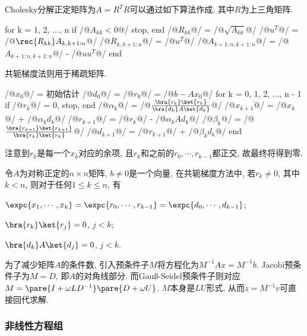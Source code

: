 \documentclass[20pt]{extarticle}
\begin{document}
Cholesky分解正定矩阵为$A=R^TR$可以通过如下算法作成. 其中$R$为上三角矩阵.
\begin{matlablst}
for k = 1, 2, ..., n
    if /@$A_{kk}<0$@/ stop, end
    /@$R_{kk}$@/ = /@$\sqrt{A_{kk}}$@/
    /@$u^T$@/ = /@$\rec{R_{kk}}A_{k,k+1:n}$@/
    /@$R_{k,k+1:n}$@/ = /@$u^T$@/
    /@$A_{k+1:n,k+1:n}$@/ = /@$A_{k+1:n,k+1:n}$@/ - /@$uu^T$@/
end
\end{matlablst}
共轭梯度法则用于稀疏矩阵.
\begin{matlablst}
/@$x_0$@/ = 初始估计
/@$d_0$@/ = /@$r_0$@/ = /@$b-Ax_0$@/
for k = 0, 1, 2, ..., n - 1
    if /@$r_k$@/ = 0, stop, end
    /@$\alpha_k$@/ = /@$\frac{\bra{r_k}\ket{r_k}}{\bra{d_k}A\ket{d_k}}$@/
    /@$x_{k+1}$@/ = /@$x_k$@/ + /@$\alpha_kd_k$@/
    /@$r_{k+1}$@/ = /@$r_k$@/ - /@$\alpha_kAd_k$@/
    /@$\beta_k$@/ = /@$\frac{\bra{r_{k+1}}\ket{r_{k+1}}}{\bra{r_k}\ket{r_k}}$@/
    /@$d_{k+1}$@/ = /@$r_{k+1}$@/ + /@$\beta_k d_k$@/
end
\end{matlablst}
注意到$r_k$是每一个$x_k$对应的余项, 且$r_k$和之前的$r_0,\cdots,r_{k-1}$都正交, 故最终将得到零.

\begin{theorem}
    令$A$为对称正定的$n\times n$矩阵, $b\neq 0$是一个向量, 在共轭梯度方法中, 若$r_k\neq 0$, 其中$k<n$, 则对于任何$1\le k\le n$, 有
    \begin{cenum}
        \item $\expc{x_1,\cdots,x_k} = \expc{r_0,\cdots,r_{k-1}} = \expc{d_0,\cdots,d_{k-1}}$;
        \item $\bra{r_k}\ket{r_j} = 0$, $j < k$;
        \item $\bra{d_k}A\ket{d_j} = 0$, $j < k$.
    \end{cenum}
\end{theorem}

\par
为了减少矩阵$A$的条件数, 引入预条件子$M$将方程化为$M^{-1}Ax = M^{-1}b$. Jacobi预条件子为$M=D$, 即$A$的对角线部分. 而Gau\ss-Seidel预条件子则对应$M = \pare{I+\omega LD^{-1}}\pare{D+\omega U}$. $M$本身是$LU$形式, 从而$z=M^{-1}v$可直接回代求解.


\subsubsection{非线性方程组} %
\label{ssub:非线性方程组}
\end{document}
